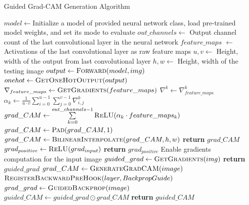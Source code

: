 \documentclass[12pt]{article}
\begin{document}
\begin{algorithm}[p]
\caption{Guided Grad-CAM Generation Algorithm}
\begin{algorithmic}[1]
\State $model\gets$Initialize a model of provided neural network class, load pre-trained model weights, and set its mode to evaluate
\State $out\_channels \gets$ Output channel count of the last convolutional layer in the neural network
\State $feature\_maps$ $\gets$ Activations of the last convolutional layer as raw feature maps
\State $u, v \gets$ Height, width of the output from last convolutional layer
\State $h, w \gets$ Height, width of the testing image
\State 
{}
    \State $output\gets \Call{Forward}{model,img}$ 
    \State $onehot\gets \Call{GetOneHotOutput}{output}$
    \State {} 
\EndProcedure
\State
{}
    \State {} 
    \State $\nabla_{feature\_maps} \gets \Call{GetGradients}{feature\_maps}$
        \State $\nabla^k \gets \nabla_{feature\_maps}^k$ 
        \State $\alpha_k \gets \frac{1}{u\cdot v}\sum\limits_{i=0}^{u-1}\sum\limits_{j=0}^{v-1}\nabla^k_{i,j}$ 
    \EndFor
    \State $grad\_CAM \gets \sum\limits_{k=0}^{out\_channels-1}\Call{ReLU}{\alpha_k\cdot feature\_maps_k}$
    \State $grad\_CAM \gets \Call{Pad}{grad\_CAM,1}$
    \State $grad\_CAM \gets \Call{BilinearInterpolate}{grad\_CAM, h, w}$
    \State {}
    \State \textbf{return} $grad\_CAM$
\EndProcedure
\State
{}
    \State $grad_{positive}\gets \Call{ReLU}{grad_{input}}$
    \State \textbf{return} $grad_{positive}$
\EndProcedure
\State
{}
    \State Enable gradients computation for the input image
    \State {} 
    \State $guided\_grad \gets \Call{GetGradients}{img}$
    \State \textbf{return} $guided\_grad$
\EndProcedure
\State
{}
    \State $grad\_CAM\gets\Call{GenerateGradCAM}{image}$
        \State $\Call{RegisterBackwardPreHook}{layer, BackpropGuide}$
    \EndFor
    \State $grad\_grad\gets\Call{GuidedBackprop}{image}$
    \State $guided\_CAM \gets guided\_grad \odot grad\_CAM$ 
    \State \textbf{return} $guided\_CAM$
\EndProcedure
\end{algorithmic}
\label{alg:alg}
\end{algorithm}
\end{document}
